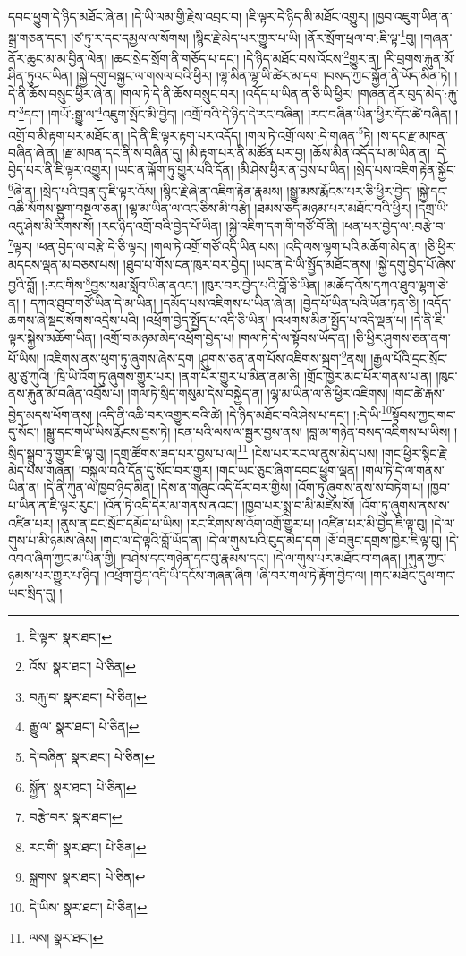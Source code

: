 དབང་ཕྱུག་དེ་ཉིད་མཐོང་ཞེ་ན། །དེ་ཡི་ལམ་གྱི་རྗེས་འབྲང་བ། །ཇི་ལྟར་དེ་ཉིད་མི་མཐོང་འགྱུར། །ཁྱབ་འཇུག་ཡིན་ན་སྒྲ་གཅན་དང་། །ཙ་ཏུ་ར་དང་དམྱལ་ལ་སོགས། །སྙིང་རྗེ་མེད་པར་གྱུར་པ་ཡི། །ནོར་སྲོག་ཕྲལ་བ་:ཇི་ལྟ་\footnote{ཇི་ལྟར་  སྣར་ཐང་། }བུ། །གཞན་ནོར་ཆུང་མ་མ་བྱིན་ལེན། །ཆང་སྲེད་སྲོག་ནི་གཅོད་པ་དང་། །དེ་ཉིད་མཐོང་བས་འོངས་\footnote{འོས་  སྣར་ཐང་།  པེ་ཅིན། }གྱུར་ན། །རི་བྲགས་རྐུན་མོ་ཤིན་ཏུའང་ཡིན། །སྐྱེ་དགུ་བསྐྱང་ལ་གསལ་བའི་ཕྱིར། །ལྷ་མིན་ལྷ་ཡི་ཚེར་མ་དག །བསད་ཀྱང་སྐྱོན་ནི་ཡོད་མིན་ཏེ། །དེ་ནི་ཆོས་བསྲུང་ཕྱིར་ཞེ་ན། །གལ་ཏེ་དེ་ནི་ཆོས་བསྲུང་བར། །འདོད་པ་ཡིན་ན་ཅི་ཡི་ཕྱིར། །གཞན་ནོར་བུད་མེད་:རྐུ་བ་\footnote{བརྐུ་བ་  སྣར་ཐང་།  པེ་ཅིན། }དང་། །གཡོ་:སྒྱུ་ལ་\footnote{རྒྱུ་ལ་  སྣར་ཐང་།  པེ་ཅིན། }འཇུག་སྤོང་མི་བྱེད། །འགྲོ་བའི་དེ་ཉིད་དེ་རང་བཞིན། །རང་བཞིན་ཡིན་ཕྱིར་དོང་ཚེ་བཞིན། །འགྲོ་བ་མི་རྟག་པར་མཐོང་ན། །དེ་ནི་ཇི་ལྟར་རྟག་པར་འདོད། །གལ་ཏེ་འགྲོ་ལས་:དེ་གཞན་\footnote{དེ་བཞིན་  སྣར་ཐང་།  པེ་ཅིན། }ཏེ། །ས་དང་རྫ་མཁན་བཞིན་ཞེ་ན། །རྫ་མཁན་དང་ནི་ས་བཞིན་དུ། །མི་རྟག་པར་ནི་མཚོན་པར་བྱ། །ཆོས་མིན་འདོད་པ་མ་ཡིན་ན། །དེ་བྱེད་པར་ནི་ཇི་ལྟར་འགྱུར། །ཡང་ན་ལྐོག་ཏུ་གྱུར་པའི་དོན། །མི་ཤེས་ཕྱིར་ན་བྱས་པ་ཡིན། །སྲེད་པས་འཇིག་རྟེན་སྐྱོང་\footnote{སྐྱོན་  སྣར་ཐང་།  པེ་ཅིན། }ཞེ་ན། །སྲེད་པའི་བྲན་དུ་ཇི་ལྟར་འོས། །སྙིང་རྗེ་ཞེ་ན་འཇིག་རྟེན་རྣམས། །སྒྱུ་མས་རྨོངས་པར་ཅི་ཕྱིར་བྱེད། །སྐྱེ་དང་འཆི་སོགས་སྡུག་བསྔལ་ཅན། །ལྷ་མ་ཡིན་ལ་འང་ཅིས་མི་བརྩེ། །ཐམས་ཅད་མཉམ་པར་མཐོང་བའི་ཕྱིར། །དགྲ་ཡི་འདུ་ཤེས་མི་རིགས་སོ། །རང་ཉིད་འགྲོ་བའི་བྱེད་པོ་ཡིན། །སྐྱེ་འཇིག་དག་གི་གཙོ་བོ་ནི། །ཕན་པར་བྱེད་ལ་:བརྩེ་བ་\footnote{བརྩེ་བར་  སྣར་ཐང་། }ལྟར། །ཕན་བྱེད་ལ་བརྩེ་དེ་ཅི་ལྟར། །གལ་ཏེ་འགྲོ་གཙོ་འདི་ཡིན་པས། །འདི་ལས་ལྷག་པའི་མཆོག་མེད་ན། །ཅི་ཕྱིར་མདངས་ལྡན་མ་བཅས་པས། །ཐུབ་པ་གོས་ངན་ཁུར་བར་བྱེད། །ཡང་ན་དེ་ཡི་སྤྱོད་མཐོང་ནས། །སྐྱེ་དགུ་བྱེད་པོ་ཞེས་བྱའི་བློ། །:རང་གིས་\footnote{རང་གི་  སྣར་ཐང་།  པེ་ཅིན། }བྱས་སམ་སློབ་ཡིན་ནའང་། །ཁུར་བར་བྱེད་པའི་བློ་ཅི་ཡིན། །མཆོད་འོས་དཀའ་ཐུབ་ལྷག་ཅེ་ན། །
དཀའ་ཐུབ་གཙོ་ཡིན་དེ་མ་ཡིན། །དམོད་པས་འཇིགས་པ་ཡིན་ཞེ་ན། །བྱེད་པོ་ཡིན་པའི་ཡོན་ཏན་ཅི། །འདོད་ཆགས་ཞེ་སྡང་སོགས་འདྲེས་པའི། །འཕྲོག་བྱེད་སྤྱོད་པ་འདི་ཅི་ཡིན། །འཕགས་མིན་སྤྱོད་པ་འདི་ལྡན་པ། །དེ་ནི་ཇི་ལྟར་སྐྱེས་མཆོག་ཡིན། །འགྲོ་བ་མཉམ་མེད་འཕྲོག་བྱེད་པ། །གལ་ཏེ་དེ་ལ་སྟོབས་ཡོད་ན། །ཅི་ཕྱིར་ཤུགས་ཅན་ནག་པོ་ཡིས། །འཇིགས་ནས་ཕུག་ཏུ་ཞུགས་ཞེས་དྲག །ཤུགས་ཅན་ནག་པོས་འཇིགས་སྐྲག་\footnote{སྐྲགས་  སྣར་ཐང་།  པེ་ཅིན། }ནས། །རྒྱལ་པོའི་དྲང་སྲོང་མུ་ཙུ་ཀུའི། །ཁྲི་ཡི་འོག་ཏུ་ཞུགས་གྱུར་པར། །ནག་པོར་གྱུར་པ་མིན་ནམ་ཅི། །གྲོང་ཁྱེར་མང་པོར་གནས་པ་ན། །ཁུང་ནས་རྐུན་མོ་བཞིན་འབྲོས་པ། །གལ་ཏེ་སྲིད་གསུམ་དེས་བསྐྱེད་ན། །ལྷ་མ་ཡིན་ལ་ཅི་ཕྱིར་འཇིགས། །གང་ཚེ་རྒས་བྱེད་མདས་ཕོག་ནས། །འདི་ནི་འཆི་བར་འགྱུར་བའི་ཚེ། །དེ་ཉིད་མཐོང་བའི་ཤེས་པ་དང་། །:དེ་ཡི་\footnote{དེ་ཡིས་  སྣར་ཐང་།  པེ་ཅིན། }སྟོབས་ཀྱང་གང་དུ་སོང་། །སྒྱུ་དང་གཡོ་ཡིས་རྨོངས་བྱས་ཏེ། །ངན་པའི་ལས་ལ་སྦྱར་བྱས་ནས། །བླ་མ་གཉེན་བསད་འཇིགས་པ་ཡིས། །སྲིད་སྒྲུབ་ཏུ་གྱུར་ཇི་ལྟ་བུ། །དགྲ་ཚོགས་ཟད་པར་བྱས་པ་ལ།\footnote{ལས།  སྣར་ཐང་། } །ངེས་པར་རང་ལ་ནུས་མེད་པས། །གང་ཕྱིར་སྙིང་རྗེ་མེད་པས་གཞན། །བསྐུལ་བའི་དོན་དུ་སོང་བར་གྱུར། །གང་ཡང་ཅུང་ཞིག་དབང་ཕྱུག་ལྡན། །གལ་ཏེ་དེ་ལ་གནས་ཡིན་ན། །དེ་ནི་ཀུན་ལ་ཁྱབ་ཉིད་མིན། །དེས་ན་གཞུང་འདི་དོར་བར་གྱིས། །འོག་ཏུ་ཞུགས་ནས་ས་བཏེག་པ། །ཁྱབ་པ་ཡིན་ན་ཇི་ལྟར་རུང་། །འོན་ཏེ་འདི་དེར་མ་གནས་ནའང་། །ཁྱབ་པར་སྨྲ་བ་མི་མཛེས་སོ། །འོག་ཏུ་ཞུགས་ནས་ས་འཛིན་པར། །ནུས་ན་དྲང་སྲོང་དམོད་པ་ཡིས། །རང་རིགས་ས་འོག་འགྲོ་གྱུར་པ། །འཛིན་པར་མི་བྱེད་ཇི་ལྟ་བུ། །དེ་ལ་གུས་པ་མི་ཉམས་ཞེས། །གང་ལ་དེ་ལྟའི་བློ་ཡོད་ན། །དེ་ལ་གུས་པའི་བུད་མེད་དག །ཅོ་བཟུང་དགྲས་ཁྱེར་ཇི་ལྟ་བུ། །དེ་འབའ་ཞིག་ཀྱང་མ་ཡིན་གྱི། །བཤེས་དང་གཉེན་དང་བུ་རྣམས་དང་། །དེ་ལ་གུས་པར་མཐོང་བ་གཞན། །ཀུན་ཀྱང་ཉམས་པར་གྱུར་པ་ཉིད། །འཕྲོག་བྱེད་འདི་ཡི་དངོས་གཞན་ཞིག །ཞི་བར་གལ་ཏེ་རྟོག་བྱེད་ལ། །གང་མཐོང་དུལ་གང་ཡང་སྲིད་དུ། །
